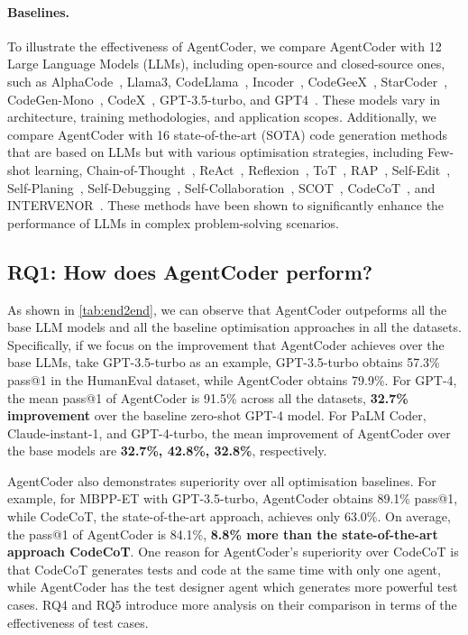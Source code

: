 \documentclass{article}
\newcommand{\xxx}{AgentCoder\xspace}
\begin{document}
\paragraph{Baselines.} To illustrate the effectiveness of \xxx, we compare \xxx with 12 Large Language Models (LLMs), including open-source and closed-source ones, such as AlphaCode~\cite{Li2022CompetitionlevelCG}, Llama3, CodeLlama~\cite{roziere2023code}, Incoder~\cite{Fried2022InCoderAG}, CodeGeeX~\cite{Zheng2023CodeGeeXAP}, StarCoder~\cite{Li2023StarCoderMT}, CodeGen-Mono~\cite{nijkamp2022codegen}, CodeX~\cite{Brown2020LanguageMA}, GPT-3.5-turbo, and GPT4~\cite{OpenAI2023GPT4TR}. These models vary in architecture, training methodologies, and application scopes. Additionally, we compare \xxx with 16 state-of-the-art (SOTA) code generation methods that are based on LLMs but with various optimisation strategies, including Few-shot learning, Chain-of-Thought~\cite{Wei2022ChainOT}, ReAct~\cite{Yao2022ReActSR}, Reflexion~\cite{Shinn2023ReflexionLA}, ToT~\cite{Yao2023TreeOT}, RAP~\cite{Hao2023ReasoningWL}, Self-Edit~\cite{Zhang2023SelfEditFC}, Self-Planing~\cite{Jiang2023SelfplanningCG}, Self-Debugging~\cite{Chen2023TeachingLL}, Self-Collaboration~\cite{Dong2023SelfcollaborationCG}, SCOT~\cite{Li2023StructuredCP},
CodeCoT~\cite{Huang2023CodeCoTAB}, 
and INTERVENOR~\cite{Wang2023INTERVENORPT}.
These methods have been shown to significantly enhance the performance of LLMs in complex problem-solving scenarios. 





\subsection{RQ1: How does \xxx perform?}

As shown in \cref{tab:end2end}, we can observe that \xxx outpeforms all the base LLM models and all the baseline optimisation approaches in all the datasets. 
Specifically, if we focus on the improvement that \xxx achieves over the base LLMs, take GPT-3.5-turbo as an example, 
GPT-3.5-turbo obtains 57.3\% pass@1 in the HumanEval dataset, while \xxx obtains 79.9\%.
For GPT-4, the mean pass@1 of \xxx is 91.5\% across all the datasets, \textbf{32.7\% improvement} over the baseline zero-shot GPT-4 model.
For PaLM Coder, Claude-instant-1, and GPT-4-turbo, the mean improvement of \xxx over the base models are \textbf{32.7\%, 42.8\%, 32.8\%}, respectively.

\xxx also demonstrates superiority over all optimisation baselines.
For example, for MBPP-ET with GPT-3.5-turbo,
\xxx obtains 89.1\% pass@1, while CodeCoT, the state-of-the-art approach, achieves only 63.0\%. 
On average, the pass@1 of \xxx is 84.1\%, \textbf{8.8\% more than the state-of-the-art approach CodeCoT}.
{\color{black}One reason for \xxx's superiority over CodeCoT is that CodeCoT generates tests and code at the same time with only one agent,}
while \xxx has the test designer agent which generates more powerful test cases. 
RQ4 and RQ5 introduce more analysis on their comparison in terms of the effectiveness of test cases. 
\end{document}
